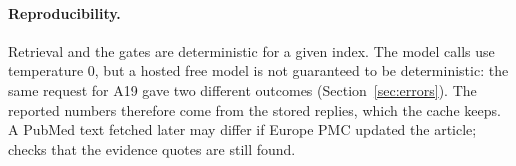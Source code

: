 \paragraph{Reproducibility.} Retrieval and the gates are deterministic for a given index. The model calls use temperature 0, but a hosted free model is not guaranteed to be deterministic: the same request for A19 gave two different outcomes (Section~\ref{sec:errors}). The reported numbers therefore come from the stored replies, which the cache keeps. A PubMed text fetched later may differ if Europe PMC updated the article;  checks that the evidence quotes are still found.
